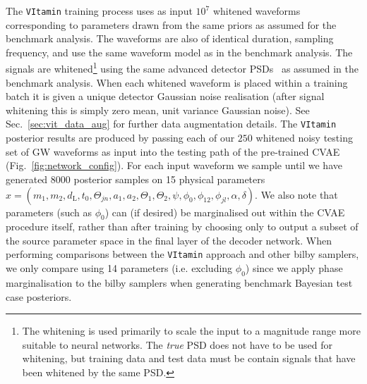 %
%
The \texttt{VItamin} training process uses as input 
$10^{7}$ whitened waveforms corresponding to parameters drawn 
from the same priors as assumed for the benchmark analysis. The 
waveforms are also of identical duration, sampling frequency, and 
use the same waveform model as in the benchmark analysis. 
The signals are whitened\footnote{The whitening is used 
primarily to scale the input to a magnitude range more suitable to 
neural networks. The \emph{true} \ac{PSD} does not have to be used for 
whitening, but training data and test data must be contain 
signals that have been whitened by the same \ac{PSD}.} using the same 
advanced detector \acp{PSD}~\cite{aligo_noisecurves} as assumed 
in the benchmark analysis. When each whitened waveform is 
placed within a training batch it is given a unique detector 
Gaussian noise realisation (after signal whitening this is simply 
zero mean, unit variance Gaussian noise). See Sec.~\ref{sec:vit_data_aug} 
for further data augmentation details. The \texttt{VItamin} posterior 
results are produced by passing each of our $250$ whitened noisy 
testing set of \ac{GW} waveforms as input into the testing path of 
the pre-trained \ac{CVAE} (Fig.~\ref{fig:network_config}). For each 
input waveform we sample until we have generated $8000$ posterior samples 
on 15 physical parameters 
$x=(m_1,m_2,d_{\text{L}},t_{0},\Theta_{jn},a_1,a_2,\Theta_1,
\Theta_2,\psi, \phi_0, \phi_{12},\phi_{jl},\alpha,\delta)$. We also note
that parameters (such as $\phi_0$) can (if desired) be 
marginalised out within the \ac{CVAE} procedure itself, rather than 
after training by choosing only to output a subset of the 
source parameter space in the final layer of the decoder network. When 
performing comparisons between the \texttt{VItamin} approach and other 
bilby samplers, we only compare using 14 parameters (i.e. excluding 
$\phi_0$) since we apply phase marginalisation to the bilby samplers when 
generating benchmark Bayesian test case posteriors. 


